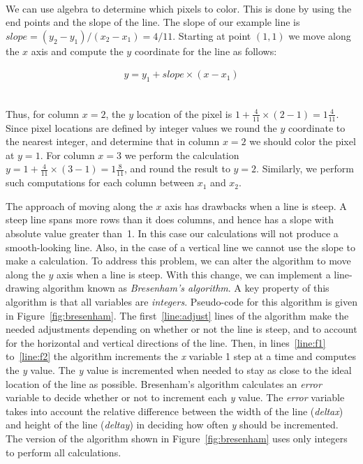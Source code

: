 \documentclass[epsfig,10pt,fullpage]{article}
\begin{document}
~\\
\noindent
We can use algebra to determine which pixels to color. This is done by using the end points and 
the slope of the line. The slope of our example line is $slope = (y_2 - y_1)/(x_2 - x_1) = 4/11$. 
Starting at point $(1,1)$ we move along the $x$ axis and compute the $y$ coordinate for the 
line as follows:

\begin{eqnarray*}
y = y_1 + slope \times (x - x_1)
\end{eqnarray*}

~\\
\noindent
Thus, for column $x = 2$, the $y$ location of the pixel is
$1 + \frac{4}{11} \times (2-1) = 1 \frac{4}{11}$. 
Since pixel locations are defined by integer values we round the $y$ coordinate to the nearest 
integer, and determine that in column $x = 2$ we should color the pixel at $y = 1$. For
column $x = 3$ we perform the calculation $y = 1 + \frac{4}{11} \times (3-1) = 1
\frac{8}{11}$, and round the result to $y = 2$.  Similarly, we perform such computations 
for each column between $x_1$ and $x_2$.

\noindent
The approach of moving along the $x$ axis has drawbacks when a line is steep. A steep line
spans more rows than it does columns, and hence has a slope with absolute value greater than~1.
In this case our calculations will not produce a smooth-looking line.  Also, in the case
of a vertical line we cannot use the slope to make a calculation.  To address this 
problem, we can alter the algorithm to move along the $y$ axis when a line is steep. With 
this change, we can implement a line-drawing algorithm known as {\it Bresenham's algorithm}.
A key property of this algorithm is that all variables are {\it integers}.
Pseudo-code for this algorithm is given in Figure~\ref{fig:bresenham}. The first~\ref{line:adjust}
lines of the algorithm make the needed adjustments depending on whether or not the line is
steep, and to account for the horizontal and vertical directions of the line. 
Then, in lines~\ref{line:f1} to~\ref{line:f2} the algorithm increments the 
{\it x} variable 1 step at a time
and computes the {\it y} value. The {\it y} value is incremented when needed to stay as
close to the ideal location of the line as possible. Bresenham's algorithm calculates an
{\it error} variable to decide whether or not to increment each {\it y} value. 
The {\it error} variable takes into account the relative difference
between the width of the line ({\it deltax}) and height of the line ({\it deltay}) in deciding
how often {\it y} should be incremented. The version of the algorithm shown in 
Figure~\ref{fig:bresenham} uses only integers to perform all calculations. 
\end{document}
